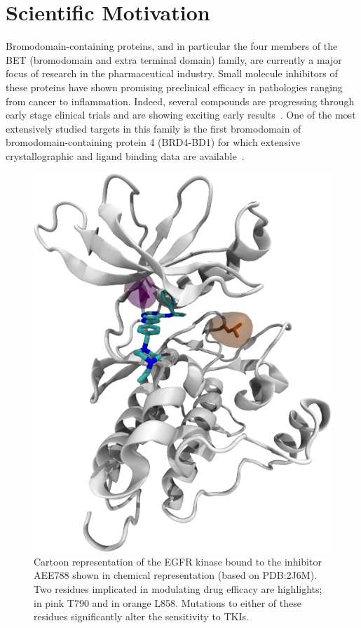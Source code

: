 \documentclass[conference]{IEEEtran}
\begin{document}

\section{Scientific Motivation}\label{sec:motivation}



Bromodomain-containing proteins, and in particular the four members of the BET
(bromodomain and extra terminal domain) family, are currently a major focus of
research in the pharmaceutical industry. Small molecule inhibitors of these
proteins have shown promising preclinical efficacy in pathologies ranging from
cancer to inflammation. Indeed, several compounds are progressing through
early stage clinical trials and are showing exciting early
results~\cite{Theodoulou2016}. One of the most extensively studied targets in
this family is the first bromodomain of bromodomain-containing protein 4
(BRD4-BD1) for which extensive crystallographic and ligand binding data are
available~\cite{Bamborough2012}.

\begin{figure}
  \centering
  \includegraphics[width=0.60\columnwidth]{./egfr.png}
  \caption{Cartoon representation of the EGFR kinase bound to the inhibitor
  AEE788 shown in chemical representation (based on PDB:2J6M). Two residues
  implicated in modulating drug efficacy are highlights; in pink T790 and in
  orange L858. Mutations to either of these residues significantly alter the
  sensitivity to TKIs.}\label{fig:egfr}
\end{figure}
\end{document}
